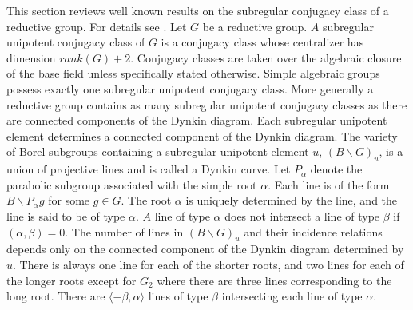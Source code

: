 \documentclass{memo-l}
\theoremstyle{definition}
\theoremstyle{remark}
\numberwithin{section}{chapter}
\numberwithin{equation}{chapter}
\begin{document}
   This section reviews well known results on the subregular conjugacy
class of a reductive group.  For details see \cite{MR0352279}.  Let $G$ be a
reductive group.  $A$ subregular unipotent conjugacy class of $G$ is a
conjugacy class whose centralizer has dimension $rank(G)+2$.  Conjugacy
classes are taken over the algebraic closure of the base field unless
specifically stated otherwise.  Simple algebraic groups possess exactly one
subregular unipotent conjugacy class.  More generally a reductive group
contains as many subregular unipotent conjugacy classes as there are
connected components of the Dynkin diagram.  Each subregular unipotent
element determines a connected component of the Dynkin diagram.  The
variety of Borel subgroups containing a subregular unipotent element $u$,
$(B\backslash G)_{u}$, is a union of projective lines and is called a Dynkin
curve.  Let $P_{{\alpha}}$ denote the parabolic subgroup associated with
the simple root ${\alpha}$.  Each line is of the form $B\backslash
P_{{\alpha}}g$ for some $g \in G$.  The root ${\alpha}$ is uniquely
determined by the line, and the line is said to be of type ${\alpha}$.  $A$
line of type ${\alpha}$ does not intersect a line of type ${\beta}$ if
$({\alpha},{\beta})=0$.  The number of lines in $(B\backslash G)_{u}$ and
their incidence relations depends only on the connected component of the
Dynkin diagram determined by $u$.  There is always one line for each of the
shorter roots, and two lines for each of the longer roots except for
$G_{2}$ where there are three lines corresponding to the long root.
There are $\langle{-\beta},{\alpha}\rangle$ lines of type ${\beta}$ intersecting
each line of type
${\alpha}$.
\end{document}
